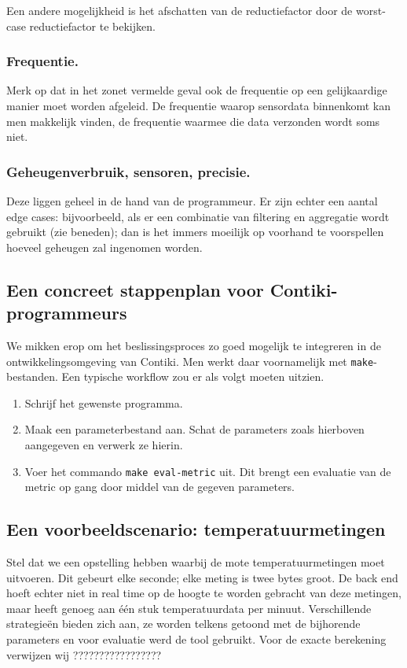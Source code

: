 \documentclass[11pt]{article}
\begin{document}
Een andere mogelijkheid is het afschatten van de reductiefactor door de
worst-case reductiefactor te bekijken.

\subsubsection{Frequentie.} Merk op dat in het zonet vermelde geval ook de
frequentie op een gelijkaardige manier moet worden afgeleid. De frequentie
waarop sensordata binnenkomt kan men makkelijk vinden, de frequentie waarmee die
data verzonden wordt soms niet. 

\subsubsection{Geheugenverbruik, sensoren, precisie.} Deze liggen geheel in de
hand van de programmeur. Er zijn echter een aantal edge cases: bijvoorbeeld, als
er een combinatie van filtering en aggregatie wordt gebruikt (zie beneden); dan
is het immers moeilijk op voorhand te voorspellen hoeveel geheugen zal ingenomen
worden.

\subsection{Een concreet stappenplan voor Contiki-programmeurs}
We mikken erop om het beslissingsproces zo goed mogelijk te integreren in
de ontwikkelingsomgeving van Contiki. Men werkt daar voornamelijk met
\texttt{make}-bestanden. Een typische workflow zou er als volgt moeten uitzien.

\begin{enumerate}
\item Schrijf het gewenste programma.
\item Maak een parameterbestand aan. Schat de parameters zoals hierboven
aangegeven en verwerk ze hierin.
\item Voer het commando \texttt{make eval-metric} uit. Dit brengt een evaluatie
van de metric op gang door middel van de gegeven parameters.
\end{enumerate}

\subsection{Een voorbeeldscenario: temperatuurmetingen}

Stel dat we een opstelling hebben waarbij de mote temperatuurmetingen moet
uitvoeren. Dit gebeurt elke seconde; elke meting is twee bytes groot. De
back end hoeft echter niet in real time op de hoogte te worden gebracht van deze
metingen, maar heeft genoeg aan \'e\'en stuk temperatuurdata per
minuut. Verschillende strategie\"en bieden zich aan, ze worden telkens getoond met de bijhorende parameters en voor evaluatie werd de tool gebruikt. Voor de exacte berekening verwijzen wij ?????????????????
\end{document}
